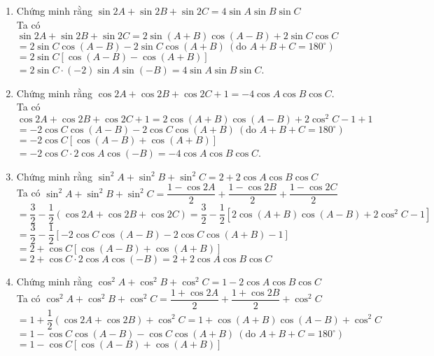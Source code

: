 \begin{bt}
{\begin{enumerate}
			$=1+2\sin \dfrac{C}{2} (-2)\sin \dfrac{A}{2} \sin \left(-\dfrac{B}{2}\right)=1+4\sin \dfrac{A}{2}\sin \dfrac{B}{2}\sin \dfrac{C}{2}$.
			\item Chứng minh rằng $\sin 2A+\sin 2B+\sin 2C=4\sin A\sin B\sin C$\\
			Ta có $\sin 2A+\sin 2B+\sin 2C=2\sin (A+B)\cos (A-B)+2\sin C\cos C$ \\
			$=2\sin C\cos (A-B)-2\sin C\cos (A+B) ~\left(\text{do } A+B+C=180^\circ\right)$ \\
			$=2\sin C\left[\cos (A-B)-\cos (A+B)\right]$ \\
			$=2\sin C\cdot(-2)\sin A\sin (-B)=4\sin A\sin B\sin C$.
			\item Chứng minh rằng $\cos 2A+\cos 2B+\cos 2C+1=-4\cos A\cos B\cos C$.\\
			Ta có $\cos 2A+\cos 2B+\cos 2C+1=2\cos (A+B)\cos (A-B)+2\cos^2C-1+1$ \\
			$=-2\cos C\cos (A-B)-2\cos C\cos (A+B) ~\left(\text{do } A+B+C=180^\circ\right)$ \\
			$=-2\cos C\left[\cos (A-B)+\cos (A+B)\right]$ \\
			$=-2\cos C\cdot 2\cos A\cos (-B)=-4\cos A\cos B\cos C$.
			\item Chứng minh rằng $\sin^2A+\sin^2B+\sin^2C=2+2\cos A\cos B\cos C$\\
			Ta có $\sin^2A+\sin^2B+\sin^2C=\dfrac{1-\cos 2A}{2}+\dfrac{1-\cos 2B}{2}+\dfrac{1-\cos 2C}{2}$ \\
			$=\dfrac{3}{2}-\dfrac{1}{2}\left(\cos 2A+\cos 2B+\cos 2C\right)=\dfrac{3}{2}-\dfrac{1}{2}\left[2\cos (A+B)\cos (A-B)+2\cos^2C-1\right]$ \\
			$=\dfrac{3}{2}-\dfrac{1}{2}\left[-2\cos C\cos (A-B)-2\cos C\cos (A+B)-1\right]$ \\
			$=2+\cos C\left[\cos (A-B)+\cos (A+B)\right]$ \\
			$=2+\cos C\cdot2\cos A\cos (-B)=2+2\cos A\cos B\cos C$
			\item Chứng minh rằng $\cos^2A+\cos^2B+\cos^2C=1-2\cos A\cos B\cos C$\\
			Ta có $\cos^2A+\cos^2B+\cos^2C=\dfrac{1+\cos 2A}{2}+\dfrac{1+\cos 2B}{2}+\cos^2C$ \\
			$=1+\dfrac{1}{2}\left(\cos 2A+\cos 2B\right)+\cos^2C=1+\cos (A+B)\cos (A-B)+\cos^2C$ \\
			$=1-\cos C\cos (A-B)-\cos C\cos (A+B) ~\left(\text{do } A+B+C=180^\circ\right)$ \\
			$=1-\cos C\left[\cos (A-B)+\cos (A+B)\right]$ \\

\end{enumerate}}
\end{bt}
